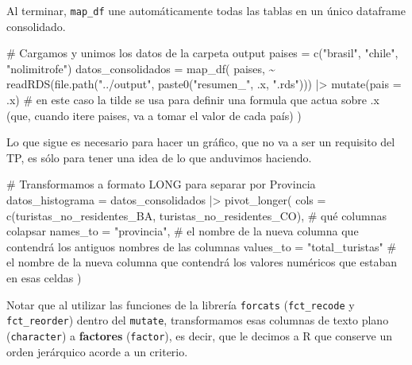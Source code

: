 \documentclass[
  spanish,
  letterpaper,
  DIV=11,
  numbers=noendperiod]{scrartcl}
\newenvironment{Shaded}{\begin{snugshade}}{\end{snugshade}}
\newcommand{\AttributeTok}[1]{\textcolor[rgb]{0.40,0.45,0.13}{#1}}
\newcommand{\CommentTok}[1]{\textcolor[rgb]{0.37,0.37,0.37}{#1}}
\newcommand{\FunctionTok}[1]{\textcolor[rgb]{0.28,0.35,0.67}{#1}}
\newcommand{\NormalTok}[1]{\textcolor[rgb]{0.00,0.23,0.31}{#1}}
\newcommand{\OtherTok}[1]{\textcolor[rgb]{0.00,0.23,0.31}{#1}}
\newcommand{\SpecialCharTok}[1]{\textcolor[rgb]{0.37,0.37,0.37}{#1}}
\newcommand{\StringTok}[1]{\textcolor[rgb]{0.13,0.47,0.30}{#1}}
\begin{document}
Al terminar, \texttt{map\_df} une automáticamente todas las tablas en un
único dataframe consolidado.

\begin{Shaded}
\begin{Highlighting}[]
\CommentTok{\# Cargamos y unimos los datos de la carpeta output}
\NormalTok{paises }\OtherTok{=} \FunctionTok{c}\NormalTok{(}\StringTok{"brasil"}\NormalTok{, }\StringTok{"chile"}\NormalTok{, }\StringTok{"nolimitrofe"}\NormalTok{)}
\NormalTok{datos\_consolidados }\OtherTok{=} \FunctionTok{map\_df}\NormalTok{(}
\NormalTok{  paises, }
  \SpecialCharTok{\textasciitilde{}} \FunctionTok{readRDS}\NormalTok{(}\FunctionTok{file.path}\NormalTok{(}\StringTok{"../output"}\NormalTok{, }\FunctionTok{paste0}\NormalTok{(}\StringTok{"resumen\_"}\NormalTok{, .x, }\StringTok{".rds"}\NormalTok{))) }\SpecialCharTok{|\textgreater{}}  \FunctionTok{mutate}\NormalTok{(}\AttributeTok{pais =}\NormalTok{ .x) }\CommentTok{\# en este caso la tilde se usa para definir una formula que actua sobre .x (que, cuando itere paises, va a tomar el valor de cada país)}
\NormalTok{  )}
\end{Highlighting}
\end{Shaded}

Lo que sigue es necesario para hacer un gráfico, que no va a ser un
requisito del TP, es sólo para tener una idea de lo que anduvimos
haciendo.

\begin{Shaded}
\begin{Highlighting}[]
\CommentTok{\# Transformamos a formato LONG para separar por Provincia}
\NormalTok{datos\_histograma }\OtherTok{=}\NormalTok{ datos\_consolidados }\SpecialCharTok{|\textgreater{}} 
  \FunctionTok{pivot\_longer}\NormalTok{(}
    \AttributeTok{cols =} \FunctionTok{c}\NormalTok{(turistas\_no\_residentes\_BA, turistas\_no\_residentes\_CO), }\CommentTok{\# qué columnas colapsar}
    \AttributeTok{names\_to =} \StringTok{"provincia"}\NormalTok{, }\CommentTok{\# el nombre de la nueva columna que contendrá los antiguos nombres de las columnas }
    \AttributeTok{values\_to =} \StringTok{"total\_turistas"} \CommentTok{\# el nombre de la nueva columna que contendrá los valores numéricos que estaban en esas celdas}
\NormalTok{  )}
\end{Highlighting}
\end{Shaded}

Notar que al utilizar las funciones de la librería \texttt{forcats}
(\texttt{fct\_recode} y \texttt{fct\_reorder}) dentro del
\texttt{mutate}, transformamos esas columnas de texto plano
(\texttt{character}) a \textbf{factores} (\texttt{factor}), es decir,
que le decimos a R que conserve un orden jerárquico acorde a un
criterio.
\end{document}
